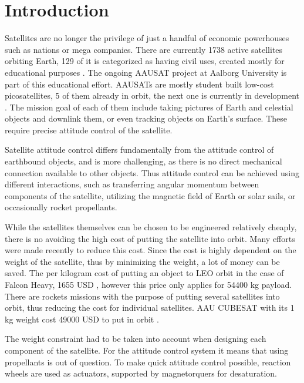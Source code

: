 \chapter{Introduction}\label{chap:Introduction}

Satellites are no longer the privilege of just a handful of economic powerhouses such as nations or mega companies. There are currently 1738 active satellites orbiting Earth, 129 of it is categorized as having civil uses, created mostly for educational purposes \cite{SatSummary}. The ongoing AAUSAT project at Aalborg University is part of this educational effort. AAUSATs are mostly student built low-cost picosatellites, 5 of them already in orbit, the next one is currently in development \cite{aausatsite}. 
 The mission goal of each of them include taking pictures of Earth and celestial objects and downlink them, or even tracking objects on Earth's surface. These require precise attitude control of the satellite. 

Satellite attitude control differs fundamentally from the attitude control of earthbound objects, and is more challenging, as there is no direct mechanical connection available to other objects. Thus attitude control can be achieved using different interactions, such as transferring angular momentum between components of the satellite, utilizing the magnetic field of Earth or solar sails, or occasionally rocket propellants.

 While the satellites themselves can be chosen to be engineered relatively cheaply, there is no avoiding the high cost of putting the satellite into orbit. Many efforts were made recently to reduce this cost.  Since the cost is highly dependent on the weight of the satellite, thus by minimizing the weight, a lot of money can be saved. The per kilogram cost of putting an object to LEO orbit in the case of Falcon Heavy, 1655 USD \cite{spaceX}, however this price only applies for 54400 kg payload. There are rockets missions with the purpose of putting several satellites into orbit, thus reducing the cost for individual satellites. AAU CUBESAT with its 1 kg weight cost 49000 USD to put in orbit \cite{AAUSATpres}.
 
 The weight constraint had to be taken into account when designing each component of the satellite. For the attitude control system it means that using propellants is out of question. To make quick attitude control possible, reaction wheels are used as actuators, supported by magnetorquers for desaturation. 
 
